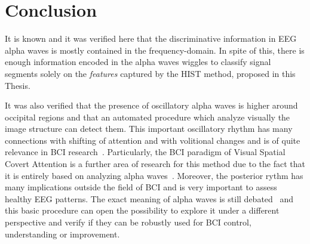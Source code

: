 \section{Conclusion}

It is known and it was verified here that the discriminative information in EEG alpha waves is mostly contained in the frequency-domain.  In spite of this,  there is enough information encoded in the alpha waves wiggles to classify signal segments solely on the \textit{features} captured by the HIST method, proposed in this Thesis.  

It was also verified that the presence of oscillatory alpha waves is higher around occipital regions and that an automated procedure which analyze visually the image structure can detect them. This important oscillatory rhythm has many connections with shifting of attention and with volitional changes and is of quite relevance in BCI research~\cite{Basar2012}.  Particularly, the BCI paradigm of Visual Spatial Covert Attention is a further area of research for this method due to the fact that it is entirely based on analyzing alpha waves~\cite{vanGerven2009}. Moreover, the posterior rythm has many implications outside the field of BCI and is very important to assess healthy EEG patterns. The exact meaning of alpha waves is still debated~\cite{Ahn2013} and this basic procedure can open the possibility to explore it under a different perspective and verify if they can be robustly used for BCI control, understanding or improvement.

%





